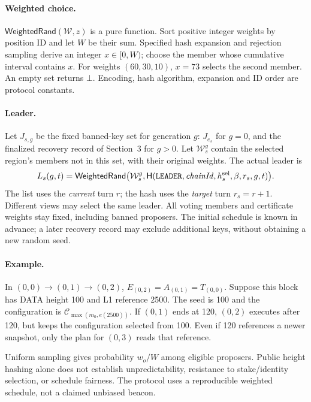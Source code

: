 \documentclass[11pt,a4paper]{article}
\newcommand{\Hash}{\mathsf H}
\newcommand{\tagg}[1]{\mathsf{#1}}
\newcommand{\cfg}{\mathcal C}
\begin{document}
\paragraph{Weighted choice.}
$\tagg{WeightedRand}(\mathcal W,z)$ is a pure function. Sort positive
integer weights by position ID and let $W$ be their sum. Specified hash
expansion and rejection sampling derive an integer $x\in[0,W)$; choose
the member whose cumulative interval contains $x$. For weights
$(60,30,10)$, $x=73$ selects the second member. An empty set returns $\bot$.
Encoding, hash algorithm, expansion and ID order are protocol constants.

\paragraph{Leader.}
Let $J_{s,g}$ be the fixed banned-key set for generation $g$: $J_{e_s}$
for $g=0$, and the finalized recovery record of Section~3 for $g>0$.
Let $\mathcal W_s^g$ contain the selected region's members not in this set,
with their original weights. The actual leader is
\begin{equation}\label{eq:leader}
 L_s(g,t)=\tagg{WeightedRand}\bigl(\mathcal W_s^g,
 \Hash(\texttt{LEADER},\mathit{chainId},h_s^{\rm sel},\beta,r_s,g,t)\bigr).
\end{equation}
The list uses the \emph{current} turn $r$; the hash uses the \emph{target}
turn $r_s=r+1$. Different views may select the same leader. All voting
members and certificate weights stay fixed, including banned proposers.
The initial schedule is known in advance; a later recovery record may
exclude additional keys, without obtaining a new random seed.

\paragraph{Example.}
In $(0,0)\to(0,1)\to(0,2)$,
$E_{(0,2)}=A_{(0,1)}=T_{(0,0)}$. Suppose this block has DATA height 100
and L1 reference 2500. The seed is 100 and the configuration is
$\cfg_{\max(m_0,e(2500))}$. If $(0,1)$ ends at 120, $(0,2)$ executes
after 120, but keeps the configuration selected from 100. Even if 120
references a newer snapshot, only the plan for $(0,3)$ reads that reference.

Uniform sampling gives probability $w_o/W$ among eligible proposers.
Public height hashing alone does not establish unpredictability,
resistance to stake/identity selection, or schedule fairness. The protocol
uses a reproducible weighted schedule, not a claimed unbiased beacon.
\end{document}
